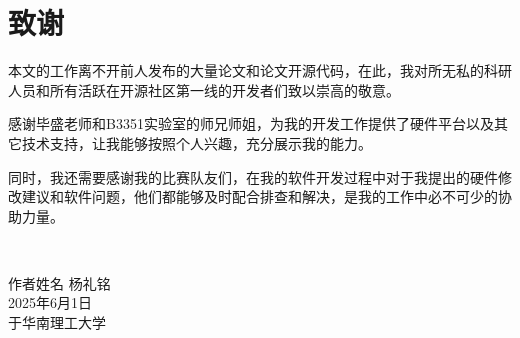\chapter{致\texorpdfstring{\quad}{}谢}
\begin{flushleft}
本文的工作离不开前人发布的大量论文和论文开源代码，在此，我对所无私的科研人员和所有活跃在开源社区第一线的开发者们致以崇高的敬意。

感谢毕盛老师和B3351实验室的师兄师姐，为我的开发工作提供了硬件平台以及其它技术支持，让我能够按照个人兴趣，充分展示我的能力。

同时，我还需要感谢我的比赛队友们，在我的软件开发过程中对于我提出的硬件修改建议和软件问题，他们都能够及时配合排查和解决，是我的工作中必不可少的协助力量。
\end{flushleft}

~\\

\begin{minipage}[t]{0.945\textwidth}%
	\begin{flushright}
		作者姓名  杨礼铭\\
		2025年6月1日\\	%
		于华南理工大学
		\par\end{flushright}
\end{minipage}

